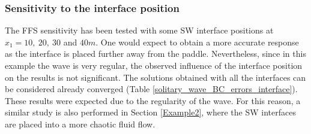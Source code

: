 







\subsubsection{Sensitivity to the interface position}
The FFS sensitivity has been tested with some SW interface positions at $x_1=10,\ 20,\ 30$ and $40m$.
One would expect to obtain a more accurate response as the interface is placed further away from the paddle.
Nevertheless, since in this example the wave is very regular, the observed influence of the interface position on the results is not significant.
The solutions obtained with all the interfaces can be considered already converged (Table \ref{solitary_wave_BC_errors_interface}). These results were expected due to the regularity of the wave. For this reason, a similar study is also performed in Section \ref{Example2}, where the SW interfaces are placed into a more chaotic fluid flow.



